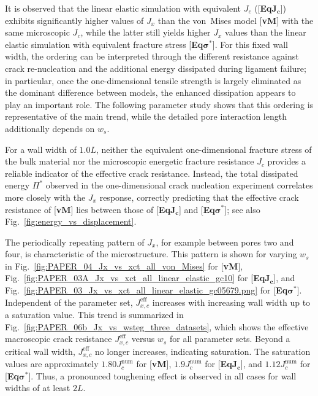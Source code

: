 \documentclass[pdflatex,sn-mathphys-num]{sn-jnl}%
\newcommand{\vMLabel}{[\textbf{vM}]\xspace}
\newcommand{\EqJcLabel}{[\textbf{Eq$\boldsymbol{J_c}$}]\xspace}
\newcommand{\EqSigmaStarLabel}{[\textbf{Eq$\boldsymbol{\sigma^*}$}]\xspace}
\theoremstyle{thmstyleone}%
\theoremstyle{thmstyletwo}%
\theoremstyle{thmstylethree}%
\begin{document}
It is observed that the linear elastic simulation with equivalent $J_c$ (\EqJcLabel) exhibits significantly higher values of $J_x$ than the von~Mises model \vMLabel with the same microscopic $J_c$, while the latter still yields higher $J_x$ values than the linear elastic simulation with equivalent fracture stress \EqSigmaStarLabel. For this fixed wall width, the ordering can be interpreted through the different resistance against crack re-nucleation and the additional energy dissipated during ligament failure; in particular, once the one-dimensional tensile strength is largely eliminated as the dominant difference between models, the enhanced dissipation appears to play an important role. The following parameter study shows that this ordering is representative of the main trend, while the detailed pore interaction length additionally depends on $w_s$.

For a wall width of $1.0L$, neither the equivalent one-dimensional fracture stress of the bulk material nor the microscopic energetic fracture resistance $J_c$ provides a reliable indicator of the effective crack resistance. Instead, the total dissipated energy $\Pi^*$ observed in 
the one-dimensional crack nucleation experiment correlates more closely with the $J_x$ response, correctly predicting that the effective crack resistance of \vMLabel lies between those of \EqJcLabel and \EqSigmaStarLabel; see also Fig.~\ref{fig:energy_vs_displacement}.

The periodically repeating pattern of $J_x$, for example between pores two and four, is characteristic of the microstructure. This pattern is shown for varying $w_s$ in Fig.~\ref{fig:PAPER_04_Jx_vs_xct_all_von_Mises} for \vMLabel, Fig.~\ref{fig:PAPER_03A_Jx_vs_xct_all_linear_elastic_gc10} for \EqJcLabel, and Fig.~\ref{fig:PAPER_03_Jx_vs_xct_all_linear_elastic_gc05679.png} for \EqSigmaStarLabel. Independent of the parameter set, $J_{x,c}^{\text{eff}}$ increases with increasing wall width up to a saturation value. This trend is summarized in Fig.~\ref{fig:PAPER_06b_Jx_vs_wsteg_three_datasets}, which shows the effective macroscopic crack resistance $J_{x,c}^{\text{eff}}$ versus $w_s$ for all parameter sets. Beyond a critical wall width, $J_{x,c}^{\text{eff}}$ no longer increases, indicating saturation. The saturation values are approximately $1.80 J_c^{\text{num}}$ for \vMLabel, $1.9 J_c^{\text{num}}$ for \EqJcLabel, and $1.12 J_c^{\text{num}}$ for \EqSigmaStarLabel. Thus, a pronounced toughening effect is observed in all cases for wall widths of at least $2L$.
\end{document}

